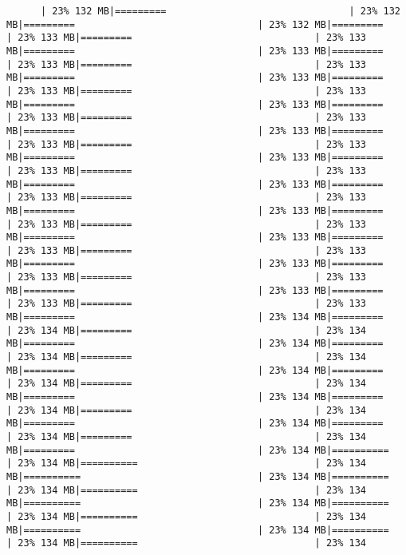 \documentclass[
]{article}
\begin{document}
\begin{verbatim}
      | 23% 132 MB|=========                                | 23% 132 MB|=========                                | 23% 132 MB|=========                                | 23% 133 MB|=========                                | 23% 133 MB|=========                                | 23% 133 MB|=========                                | 23% 133 MB|=========                                | 23% 133 MB|=========                                | 23% 133 MB|=========                                | 23% 133 MB|=========                                | 23% 133 MB|=========                                | 23% 133 MB|=========                                | 23% 133 MB|=========                                | 23% 133 MB|=========                                | 23% 133 MB|=========                                | 23% 133 MB|=========                                | 23% 133 MB|=========                                | 23% 133 MB|=========                                | 23% 133 MB|=========                                | 23% 133 MB|=========                                | 23% 133 MB|=========                                | 23% 133 MB|=========                                | 23% 133 MB|=========                                | 23% 133 MB|=========                                | 23% 133 MB|=========                                | 23% 133 MB|=========                                | 23% 133 MB|=========                                | 23% 133 MB|=========                                | 23% 133 MB|=========                                | 23% 133 MB|=========                                | 23% 133 MB|=========                                | 23% 133 MB|=========                                | 23% 133 MB|=========                                | 23% 133 MB|=========                                | 23% 133 MB|=========                                | 23% 134 MB|=========                                | 23% 134 MB|=========                                | 23% 134 MB|=========                                | 23% 134 MB|=========                                | 23% 134 MB|=========                                | 23% 134 MB|=========                                | 23% 134 MB|=========                                | 23% 134 MB|=========                                | 23% 134 MB|=========                                | 23% 134 MB|=========                                | 23% 134 MB|=========                                | 23% 134 MB|=========                                | 23% 134 MB|=========                                | 23% 134 MB|=========                                | 23% 134 MB|=========                                | 23% 134 MB|==========                               | 23% 134 MB|==========                               | 23% 134 MB|==========                               | 23% 134 MB|==========                               | 23% 134 MB|==========                               | 23% 134 MB|==========                               | 23% 134 MB|==========                               | 23% 134 MB|==========                               | 23% 134 MB|==========                               | 23% 134 MB|==========                               | 23% 134 MB|==========                               | 23% 134 
\end{verbatim}
\end{document}
